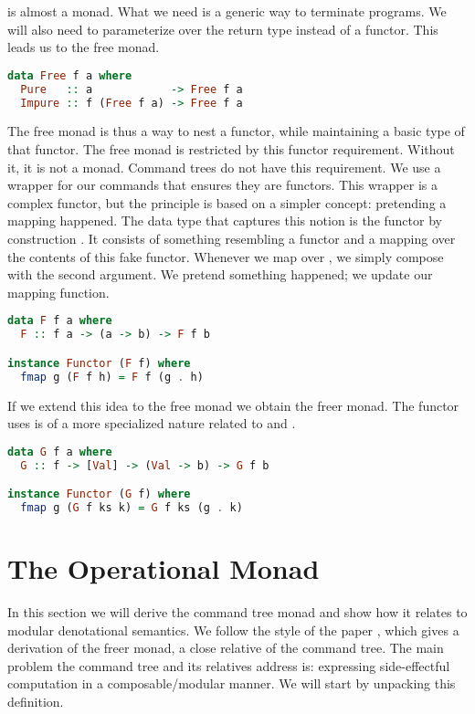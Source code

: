  is almost a monad. What we need is a generic way to terminate programs. We will also need to parameterize over the return type instead of a functor. This leads us to the free monad.

\begin{lstlisting}[language=Haskell]
data Free f a where
  Pure   :: a            -> Free f a
  Impure :: f (Free f a) -> Free f a
\end{lstlisting}

The free monad is thus a way to nest a functor, while maintaining a basic type of that functor. The free monad is restricted by this functor requirement. Without it, it is not a monad. Command trees do not have this requirement. We use a wrapper for our commands that ensures they are functors. This wrapper is a complex functor, but the principle is based on a simpler concept: pretending a mapping happened. The data type that captures this notion is the functor by construction . It consists of something resembling a functor and a mapping over the contents of this fake functor. Whenever we map over , we simply compose with the second argument. We pretend something happened; we update our mapping function.

\begin{lstlisting}[language=Haskell]
data F f a where
  F :: f a -> (a -> b) -> F f b

instance Functor (F f) where
  fmap g (F f h) = F f (g . h)
\end{lstlisting}

If we extend this idea to the free monad we obtain the freer monad. The functor  uses is of a more specialized nature related to  and .

\begin{lstlisting}[language=Haskell]
data G f a where
  G :: f -> [Val] -> (Val -> b) -> G f b

instance Functor (G f) where
  fmap g (G f ks k) = G f ks (g . k)
\end{lstlisting}

\section{\label{section:opmonad}The Operational Monad}
In this section we will derive the command tree monad and show how it relates to modular denotational semantics. We follow the style of the paper  \autocite{DBLP:conf/haskell/KiselyovI15}, which gives a derivation of the freer monad, a close relative of the command tree. The main problem the command tree and its relatives address is: expressing side-effectful computation in a composable/modular manner. We will start by unpacking this definition.


